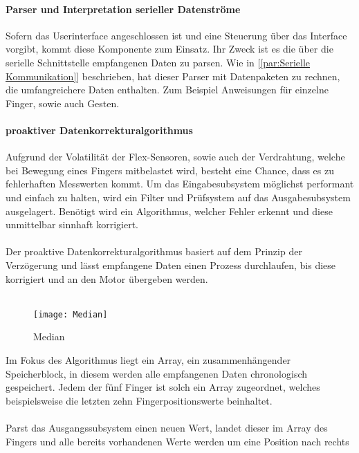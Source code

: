 \documentclass[titlepage,12pt,twoside]{article}
\begin{document}
\paragraph{Parser und Interpretation serieller Datenströme}
\label{par:Parser und Interpretation: serieller Datenströme}
\hfill \break
\hfill \break
Sofern das Userinterface angeschlossen ist und eine Steuerung über das Interface vorgibt, kommt diese Komponente zum Einsatz. Ihr Zweck ist es die über 
die serielle Schnittstelle empfangenen Daten zu parsen.  Wie in [\textcolor{blue}{\autoref{par:Serielle Kommunikation}}] beschrieben, hat dieser Parser mit 
Datenpaketen zu rechnen, die umfangreichere Daten enthalten. Zum Beispiel Anweisungen für einzelne Finger, sowie auch Gesten. \\
\newpage
\paragraph{proaktiver Datenkorrekturalgorithmus}
\label{par:proaktiver Datenkorrekturalgorithmus}
\hfill \break
\hfill \break
Aufgrund der Volatilität der Flex-Sensoren, sowie auch der Verdrahtung, welche bei Bewegung eines Fingers mitbelastet wird, besteht eine Chance, dass es 
zu fehlerhaften Messwerten kommt. Um das Eingabesubsystem möglichst performant und einfach zu halten, wird ein Filter und Prüfsystem auf das 
Ausgabesubsystem ausgelagert. Benötigt wird ein Algorithmus, welcher Fehler erkennt und diese unmittelbar sinnhaft korrigiert. \\
\\
Der proaktive Datenkorrekturalgorithmus basiert auf dem Prinzip der Verzögerung und lässt empfangene Daten einen Prozess durchlaufen, bis diese korrigiert 
und an den Motor übergeben werden. \\
\\
\begin{figure}[H]
	\begin{center}
		\scalebox{0.8}
		{\texttt{[image: Median]}}
		\caption{Median}
		\label{fig:Median}		
	\end{center}
\end{figure}
\hfill \break
Im Fokus des Algorithmus liegt ein Array, ein zusammenhängender Speicherblock, in diesem werden alle empfangenen Daten chronologisch gespeichert. Jedem 
der fünf Finger ist solch ein Array zugeordnet, welches beispielsweise die letzten zehn Fingerpositionswerte beinhaltet. \\
\\
Parst das Ausgangssubsystem einen neuen Wert, landet dieser im Array des Fingers und alle bereits vorhandenen Werte werden um eine Position nach rechts 
\end{document}
